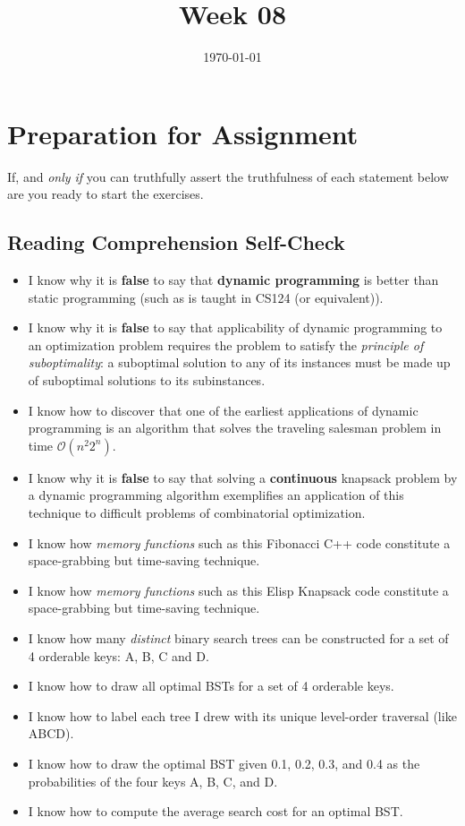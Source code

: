 \documentclass[12pt]{amsart}
\title{Week 08}
\date{\today}
\begin{document}
\maketitle

\section{Preparation for Assignment}
If, and \textit{only if} you can truthfully assert the truthfulness of each statement below are you ready to start the exercises.
\subsection {Reading Comprehension Self-Check}
\begin{itemize}
\item I know why it is \textbf{false} to say that \textbf{dynamic programming} is better than static programming (such as is taught in CS124 (or equivalent)).
 \item I know why it is \textbf{false} to say that applicability of dynamic programming to an optimization problem requires the problem to satisfy the \textit{principle of suboptimality}: a suboptimal solution to any of its instances must be made up of suboptimal solutions to its subinstances.
 \item I know how to discover that one of the earliest applications of dynamic programming is an algorithm that solves the traveling salesman problem in time $\mathcal{O}(n^2 2^n)$.
 \item I know why it is \textbf{false} to say that solving a \textbf{continuous} knapsack problem by a dynamic programming algorithm exemplifies an application of this technique to difficult problems of combinatorial optimization.
 \item I know how \textit{memory functions} such as this Fibonacci C++ code constitute a space-grabbing but time-saving technique.
 \item I know how \textit{memory functions} such as this Elisp Knapsack code constitute a space-grabbing but time-saving technique.
 
\item I know how many \textit{distinct} binary search trees can be constructed for a set of 4 orderable keys: A, B, C and D.
\item I know how to draw all optimal BSTs for a set of 4 orderable keys.
\item I know how to label each tree I drew with its unique level-order
    traversal (like ABCD).
\item I know how to draw the optimal BST given 0.1, 0.2, 0.3, and 0.4 as the probabilities of the four keys A, B, C, and D.
\item I know how to compute the average search cost for an optimal BST.
\end{itemize}
\end{document}

